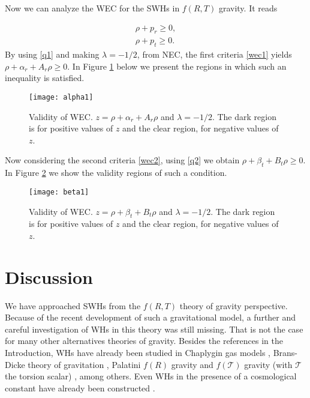 \documentclass[aps,preprint,onecolumn,11pt,showkeys]{revtex4}%
\begin{document}
Now we can analyze the WEC for the SWHs in $f(R,T)$ gravity. It reads

\begin{align}
  \rho+p_{r}\geq0,\label{wec1}\\
  \rho+p_{t}\geq0.\label{wec2}
  \end{align}  
By using \eqref{q1} and making $\lambda=-1/2$, from NEC, the first criteria \eqref{wec1} yields  $\rho+\alpha_{r}+A_{r}\rho\geq0$. In Figure \ref{alphafig} below we present the regions in which such an inequality is satisfied.

\begin{figure}[h!]
\begin{center}
  \texttt{[image: alpha1]}
\end{center}
\caption{Validity of WEC. $z=\rho+\alpha_{r}+A_{r}\rho$ and $\lambda=-1/2$. The dark region is for positive values of $z$ and the clear region, for negative values of $z$.}
\label{alphafig}
\end{figure}

Now considering the second criteria \eqref{wec2}, using \eqref{q2} we obtain $\rho+\beta_{t}+B_{t}\rho\geq0$. In Figure \ref{betafig} we show the validity regions of such a condition.

\begin{figure}[h!]
\begin{center}
  \texttt{[image: beta1]}
\end{center}
\label{betafig}
\caption{Validity of WEC. $z=\rho+\beta_{t}+B_{t}\rho$ and $\lambda=-1/2$. The dark region is for positive values of $z$ and the clear region, for negative values of $z$.}
\end{figure}

\section{Discussion}

\label{sec:dis}

We have approached SWHs from the $f(R,T)$ theory of gravity perspective.
Because of the recent development of such a gravitational model, a further
and careful investigation of WHs in this theory was still missing. That is not
the case for many other alternatives theories of gravity. Besides the
references in the Introduction, WHs have already been studied in Chaplygin gas
models \cite{lobo/2006}, Brans-Dicke theory of gravitation
\cite{nandi/1998,agnese/1995}, Palatini $f(R)$ gravity
\cite{bambi/2016,capozziello/2012} and $f(\mathcal{T})$ gravity (with
$\mathcal{T}$ the torsion scalar) \cite{sharif/2013}, among others. Even WHs
in the presence of a cosmological constant have already been constructed
\cite{richarte/2013b,lemos/2003}.
\end{document}
